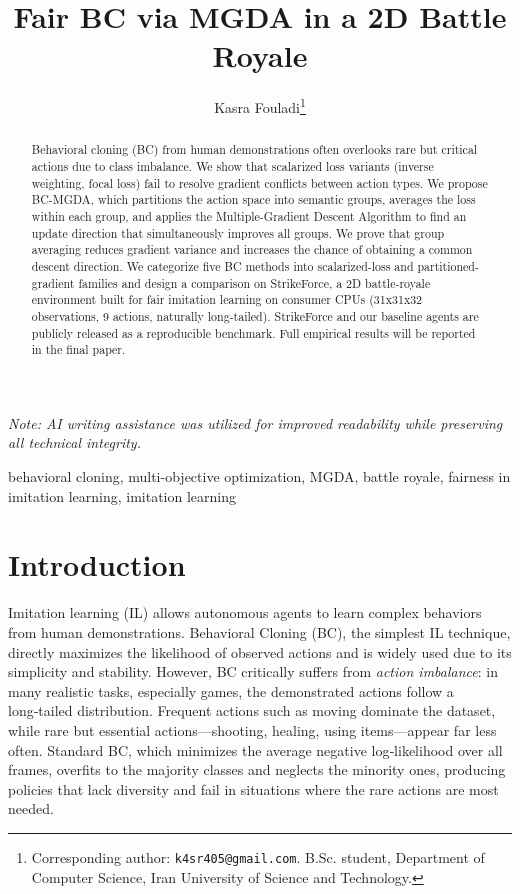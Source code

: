\documentclass[conference]{IEEEtran}
\title{Fair BC via MGDA in a 2D Battle Royale}
\author{Kasra Fouladi\thanks{Corresponding author: \texttt{k4sr405@gmail.com}. B.Sc. student, Department of Computer Science, Iran University of Science and Technology.}}
\affil{\textbf{GitHub}: \url{https://github.com/bistoyek21-ric/StrikeForce}}
\begin{document}
\maketitle

\begin{center}
\small\textit{Note: AI writing assistance was utilized for improved readability while preserving all technical integrity.}
\end{center}

\begin{abstract}
Behavioral cloning (BC) from human demonstrations often overlooks rare but critical actions due to class imbalance. We show that scalarized loss variants (inverse weighting, focal loss) fail to resolve gradient conflicts between action types. We propose BC-MGDA, which partitions the action space into semantic groups, averages the loss within each group, and applies the Multiple-Gradient Descent Algorithm to find an update direction that simultaneously improves all groups. We prove that group averaging reduces gradient variance and increases the chance of obtaining a common descent direction. We categorize five BC methods into scalarized-loss and partitioned-gradient families and design a comparison on StrikeForce, a 2D battle‑royale environment built for fair imitation learning on consumer CPUs (31x31x32 observations, 9 actions, naturally long‑tailed). StrikeForce and our baseline agents are publicly released as a reproducible benchmark. Full empirical results will be reported in the final paper.
\end{abstract}

\begin{IEEEkeywords}
behavioral cloning, multi-objective optimization, MGDA, battle royale, fairness in imitation learning, imitation learning
\end{IEEEkeywords}

\section{Introduction}
Imitation learning (IL) allows autonomous agents to learn complex behaviors from human demonstrations. Behavioral Cloning (BC), the simplest IL technique, directly maximizes the likelihood of observed actions and is widely used due to its simplicity and stability. However, BC critically suffers from \emph{action imbalance}: in many realistic tasks, especially games, the demonstrated actions follow a long‑tailed distribution. Frequent actions such as moving dominate the dataset, while rare but essential actions—shooting, healing, using items—appear far less often. Standard BC, which minimizes the average negative log‑likelihood over all frames, overfits to the majority classes and neglects the minority ones, producing policies that lack diversity and fail in situations where the rare actions are most needed.
\end{document}
